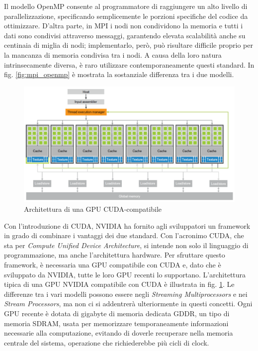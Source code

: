 Il modello OpenMP consente al programmatore di raggiungere un alto livello di parallelizzazione, specificando semplicemente le porzioni specifiche del codice da ottimizzare. D'altra parte, in MPI i nodi non condividono la memoria e tutti i dati sono condivisi attraverso messaggi, garantendo elevata scalabilità anche su centinaia di miglia di nodi; implementarlo, però, può risultare difficile proprio per la mancanza di memoria condivisa tra i nodi. A causa della loro natura intrinsecamente diversa, è raro utilizzare contemporaneamente questi standard. In fig. \ref{fig:mpi_openmp} è mostrata la sostanziale differenza tra i due modelli.

\begin{figure}[ht]
    \centering
    \includegraphics[width=.9\linewidth]{images/chapter2/cuda_arch.png}
    \caption{Architettura di una GPU CUDA-compatibile}
    \label{fig:cuda_arch}
\end{figure}

Con l'introduzione di \gls{CUDA}, NVIDIA ha fornito agli sviluppatori un framework in grado di combinare i vantaggi dei due standard. Con l'acronimo \gls{CUDA}, che sta per \textit{Compute Unified Device Architecture}, si intende non solo il linguaggio di programmazione, ma anche l'architettura hardware. Per sfruttare questo framework, è necessaria una \gls{GPU} compatibile con \gls{CUDA} e, dato che è sviluppato da NVIDIA, tutte le loro \gls{GPU} recenti lo supportano. L'architettura tipica di una \gls{GPU} NVIDIA compatibile con \gls{CUDA} è illustrata in fig. \ref{fig:cuda_arch}. Le differenze tra i vari modelli possono essere negli \textit{Streaming Multiprocessors} e nei \textit{Stream Processors}, ma non ci si addentrerà ulteriormente in questi concetti. Ogni \gls{GPU} recente è dotata di gigabyte di memoria dedicata \gls{GDDR}, un tipo di memoria \gls{SDRAM}, usata per memorizzare temporaneamente informazioni necessarie alla computazione, evitando di doverle recuperare nella memoria centrale del sistema, operazione che richiederebbe più cicli di clock.


